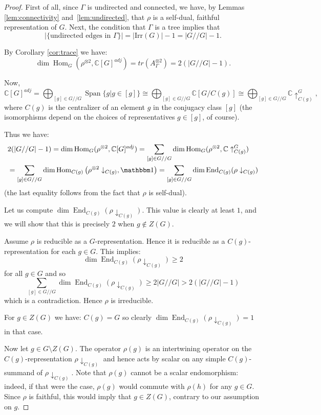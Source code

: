 \documentclass[ALCO]{cedram}
\newcommand{\Hom}{\operatorname{Hom}}
\newcommand{\triv}{{\mathbbm 1}}
\newcommand{\Span}{{\operatorname{Span}}}
\newcommand{\End}{\operatorname{End}}
\newcommand{\C}{{\mathbb C}}
\newcommand{\abs}[1]{\left|{#1}\right|}
\newcommand{\Hom}{\operatorname{Hom}}
\begin{document}
\begin{proof}
First of all, since $\Gamma$ is undirected and connected, we have, by Lemmas \ref{lem:connectivity} and~\ref{lem:undirected}, that $\rho$ is a self-dual, faithful representation of $G$. Next, the condition that $\Gamma$ is a tree implies that $$\abs{\{\text{undirected edges in } \Gamma\}} = \abs{\mathrm{Irr}(G)}-1 = \abs{G//G} -1.$$

By Corollary \ref{cor:trace} we have:
 \begin{equation}\label{eq:sq_char}
\dim \Hom_G(\rho^{\otimes 2}, \C[G]^{adj}) = tr(A_{\Gamma}^{\otimes 2})= 2(\abs{G//G} -1).  
 \end{equation}

 Now, 
 $$\C[G]^{adj} = \bigoplus_{[g] \in G//G} \Span\{g |g\in [g]\} \cong \bigoplus_{[g] \in G//G} \C[G/C(g)] \cong \bigoplus_{[g] \in G//G} \C\uparrow^G_{C(g)}, $$
 where $C(g)$ is the centralizer of an element $g$ in the conjugacy class $[g]$ (the isomorphisms depend on the choices of representatives $g\in [g]$, of course).
 
 
 Thus we have:
\begin{align}\label{eq:sum_dim_end}
 \nonumber&2(\abs{G//G} -1) = \dim \Hom_G(\rho^{\otimes 2}, \C[G]^{adj})  = \sum_{[g] \in G//G} \dim \Hom_G(\rho^{\otimes 2}, \C\uparrow^G_{C(g)} )  \\ &=\sum_{[g] \in G//G} \dim \Hom_{C(g)}\left(\rho^{\otimes 2} \downarrow_{C(g)}, \triv\right)= \sum_{[g] \in G//G}  \dim \End_{C(g)}(\rho \downarrow_{C(g)})
\end{align}
(the last equality follows from the fact that $\rho$ is self-dual). 


Let us compute $ \dim \End_{C(g)}(\rho \downarrow_{C(g)})$. This value is clearly at least $1$, and we will show that this is precisely $2$ when $g\notin Z(G)$.


Assume $\rho$ is reducible as a $G$-representation. Hence it is reducible as a $C(g)$-representation for each $g\in G$. This implies: $$\dim \End_{C(g)}(\rho \downarrow_{C(g)})\geq 2$$ for all $g\in G$ and so $$\sum_{[g] \in G//G}  \dim \End_{C(g)}(\rho \downarrow_{C(g)}) \geq 2\abs{G//G} >2(\abs{G//G} -1)$$ which is a contradiction. Hence $\rho$ is irreducible.  

For $g\in Z(G)$ we have: $C(g)=G$ so clearly $ \dim \End_{C(g)}(\rho \downarrow_{C(g)})=1$ in that case.


Now let $g\in G \setminus Z(G)$. The operator $\rho(g)$ is an intertwining operator on the $C(g)$-representation $\rho \downarrow_{C(g)}$ and hence acts by scalar on any simple $C(g)$-summand of $\rho \downarrow_{C(g)}$. Note that $\rho(g)$ cannot be a scalar endomorphism: indeed, if that were the case, $\rho(g)$ would commute with $\rho(h)$ for any $g\in G$. Since $\rho$ is faithful, this would imply that $g \in Z(G)$, contrary to our assumption on $g$.





\end{proof}
\end{document}
